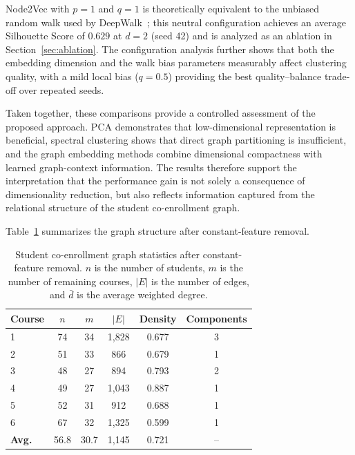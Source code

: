 \documentclass[pdflatex,sn-mathphys-num,iicol]{sn-jnl}%
\theoremstyle{thmstyleone}%
\theoremstyle{thmstyletwo}%
\theoremstyle{thmstylethree}%
\begin{document}
Node2Vec with $p=1$ and $q=1$ is theoretically equivalent to the unbiased random walk used by DeepWalk~\cite{perozzi2014deepwalk}; this neutral configuration achieves an average Silhouette Score of $0.629$ at $d=2$ (seed 42) and is analyzed as an ablation in Section~\ref{sec:ablation}. The configuration analysis further shows that both the embedding dimension and the walk bias parameters measurably affect clustering quality, with a mild local bias ($q=0.5$) providing the best quality--balance trade-off over repeated seeds.

Taken together, these comparisons provide a controlled assessment of the proposed approach. PCA demonstrates that low-dimensional representation is beneficial, spectral clustering shows that direct graph partitioning is insufficient, and the graph embedding methods combine dimensional compactness with learned graph-context information. The results therefore support the interpretation that the performance gain is not solely a consequence of dimensionality reduction, but also reflects information captured from the relational structure of the student co-enrollment graph.

Table~\ref{tab:graph_stats} summarizes the graph structure after constant-feature removal.

\begin{table}[t]
\centering
\caption{Student co-enrollment graph statistics after constant-feature removal. $n$ is the number of students, $m$ is the number of remaining courses, $|E|$ is the number of edges, and $\bar{d}$ is the average weighted degree.}
\label{tab:graph_stats}
\begin{tabular}{lccccc}
\toprule
\textbf{Course} & $n$ & $m$ & $|E|$ & Density & Components \\
\midrule
1 & 74 & 34 & 1{,}828 & 0.677 & 3 \\
2 & 51 & 33 & 866 & 0.679 & 1 \\
3 & 48 & 27 & 894 & 0.793 & 2 \\
4 & 49 & 27 & 1{,}043 & 0.887 & 1 \\
5 & 52 & 31 & 912 & 0.688 & 1 \\
6 & 67 & 32 & 1{,}325 & 0.599 & 1 \\
\midrule
\textbf{Avg.} & 56.8 & 30.7 & 1{,}145 & 0.721 & -- \\
\bottomrule
\end{tabular}
\end{table}
\end{document}

